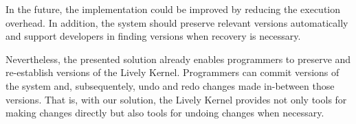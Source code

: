 In the future, the implementation could be improved by reducing the execution overhead.
In addition, the system should preserve relevant versions automatically and support developers in finding versions when recovery is necessary.

Nevertheless, the presented solution already enables programmers to preserve and re-establish versions of the Lively Kernel.
Programmers can commit versions of the system and, subsequentely, undo and redo changes made in-between those versions.
That is, with our solution, the Lively Kernel provides not only tools for making changes directly but also tools for undoing changes when necessary.

